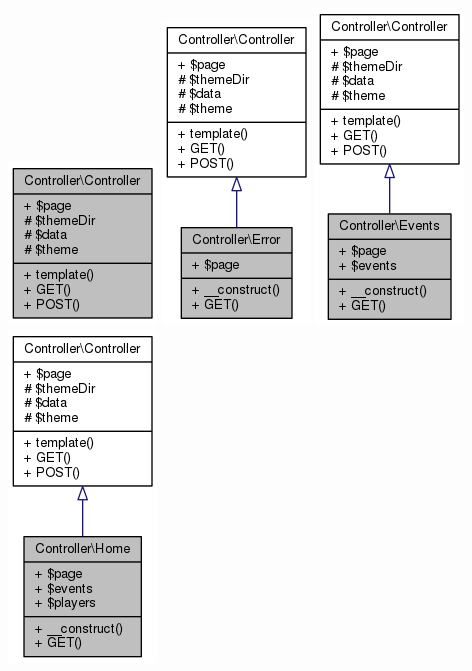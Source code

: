 \documentclass[11pt]{article}
\begin{document}
\includegraphics[scale=0.4]{UML_Controller_1_1Controller.png}
\includegraphics[scale=0.4]{UML_Controller_1_1Error.png}
\includegraphics[scale=0.4]{UML_Controller_1_1Events.png}
\includegraphics[scale=0.4]{UML_Controller_1_1Home.png}
\end{document}
